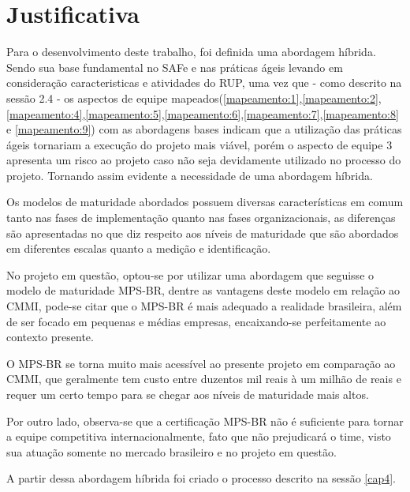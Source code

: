 \section{Justificativa}

Para o desenvolvimento deste trabalho, foi definida uma abordagem híbrida.
Sendo sua base fundamental no SAFe e nas práticas ágeis levando em consideração
caracteristicas e atividades do RUP, uma vez que - como descrito na sessão 2.4
- os aspectos de equipe mapeados(\ref{mapeamento:1},\ref{mapeamento:2},\ref{mapeamento:4},\ref{mapeamento:5},\ref{mapeamento:6},\ref{mapeamento:7},\ref{mapeamento:8} e \ref{mapeamento:9}) com as abordagens bases
indicam que a utilização das práticas ágeis tornariam a execução do projeto mais
viável, porém o aspecto de equipe 3 apresenta um risco ao projeto caso não seja
devidamente utilizado no processo do projeto. Tornando assim evidente a necessidade
de uma abordagem híbrida.

Os modelos de maturidade abordados possuem diversas características em comum tanto nas fases
de implementação quanto nas fases organizacionais, as diferenças são apresentadas no que diz
respeito aos níveis de maturidade que são abordados em diferentes escalas quanto a medição e identificação.

No projeto em questão, optou-se por utilizar uma abordagem que seguisse o modelo de maturidade MPS-BR,
dentre as vantagens deste modelo em relação ao CMMI, pode-se citar que o MPS-BR é mais adequado a
realidade brasileira, além de ser focado em pequenas e médias empresas, encaixando-se
perfeitamente ao contexto presente.

O MPS-BR se torna muito mais acessível ao presente projeto em comparação ao CMMI,
que geralmente tem custo entre duzentos mil reais à um milhão de reais e requer um
certo tempo para se chegar aos níveis de maturidade mais altos.

Por outro lado, observa-se que a certificação MPS-BR não é suficiente para tornar
a equipe competitiva internacionalmente, fato que não prejudicará o time, visto sua
atuação somente no mercado brasileiro e no projeto em questão.

A partir dessa abordagem híbrida foi criado o processo descrito na sessão \ref{cap4}.
